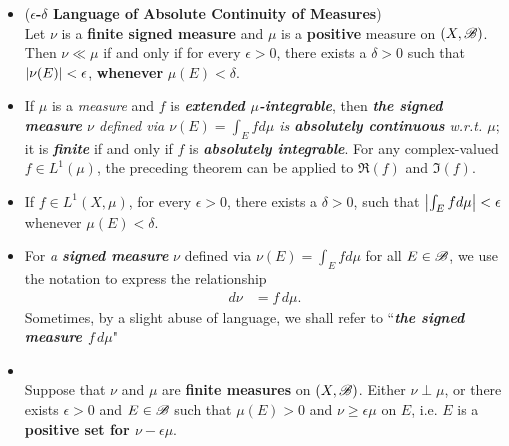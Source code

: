 \documentclass[11pt]{article}
\begin{document}
\begin{itemize}
 \item \begin{theorem} (\textbf{$\epsilon$-$\delta$ Language of Absolute Continuity of Measures})\\
Let $\nu$ is a \textbf{finite signed measure} and $\mu$ is a \textbf{positive} measure on $(X,{\mathscr B})$. Then $\nu \ll \mu$ if and only if for every $\epsilon>0$, there exists a $\delta>0$ such that $\left\lvert \nu(E) \right\rvert<\epsilon$, \textbf{whenever} $\mu(E)< \delta$.
\end{theorem}

\item \begin{remark}
 If $\mu$ is a \emph{measure} and $f$ is \emph{\textbf{extended $\mu$-integrable}}, then \emph{\textbf{the signed measure} $\nu$ defined via $\nu(E) = \int_{E}f d\mu$ is \textbf{absolutely continuous} w.r.t. $\mu$}; it is \emph{\textbf{finite}} if and only if $f$ is \emph{\textbf{absolutely integrable}}.  For any complex-valued $f \in L^1(\mu)$, the preceding theorem can be applied to $\Re(f)$ and $\Im(f)$.
 \end{remark}
 
 \item \begin{corollary}
If $f\in L^{1}(X, \mu)$, for every $\epsilon>0$, there exists a $\delta>0$, such that $\left\lvert \int_{E}f d\mu  \right\rvert<\epsilon$ whenever $\mu(E)<\delta$.
\end{corollary}
 
\item \begin{definition} 
For \emph{a \textbf{signed measure}}  $\nu$ defined via $\nu(E) = \int_{E}f d\mu$ for all $E \in {\mathscr B}$, we use the notation to express the relationship
 \begin{align*}
d\nu &= f\, d\mu.
\end{align*} Sometimes, by a slight abuse of language, we shall refer to ``\emph{\textbf{the signed measure $f\, d\mu$}}" 
\end{definition} 
 
 \item \begin{lemma}\citep{folland2013real}\\
Suppose that $\nu$ and $\mu$ are \textbf{finite measures} on $(X,{\mathscr B})$. Either $\nu \perp \mu$, or there exists $\epsilon>0$ and $E\in {\mathscr B}$ such that  $\mu(E)>0$ and $\nu \ge \epsilon \mu$ on $E$, i.e. $E$ is a \textbf{positive set for $\nu-\epsilon \mu$}. 
\end{lemma}


\end{itemize}
\end{document}
